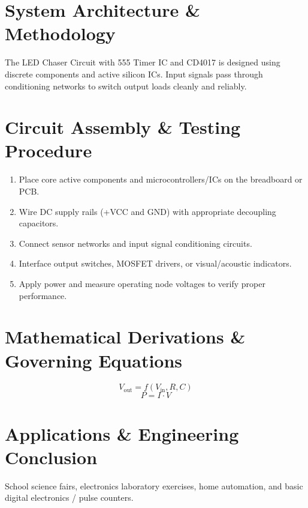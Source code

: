 \documentclass[11pt,a4paper]{article}
\begin{document}
\section{System Architecture \& Methodology}
The LED Chaser Circuit with 555 Timer IC and CD4017 is designed using discrete components and active silicon ICs. Input signals pass through conditioning networks to switch output loads cleanly and reliably.

\section{Circuit Assembly \& Testing Procedure}
\begin{enumerate}
    \item Place core active components and microcontrollers/ICs on the breadboard or PCB.
    \item Wire DC supply rails (+VCC and GND) with appropriate decoupling capacitors.
    \item Connect sensor networks and input signal conditioning circuits.
    \item Interface output switches, MOSFET drivers, or visual/acoustic indicators.
    \item Apply power and measure operating node voltages to verify proper performance.
\end{enumerate}

\section{Mathematical Derivations \& Governing Equations}
\begin{equation}
V_{\text{out}} = f(V_{\text{in}}, R, C)
\end{equation}
\begin{equation}
P = I \cdot V
\end{equation}

\section{Applications \& Engineering Conclusion}
School science fairs, electronics laboratory exercises, home automation, and basic digital electronics / pulse counters.
\end{document}
